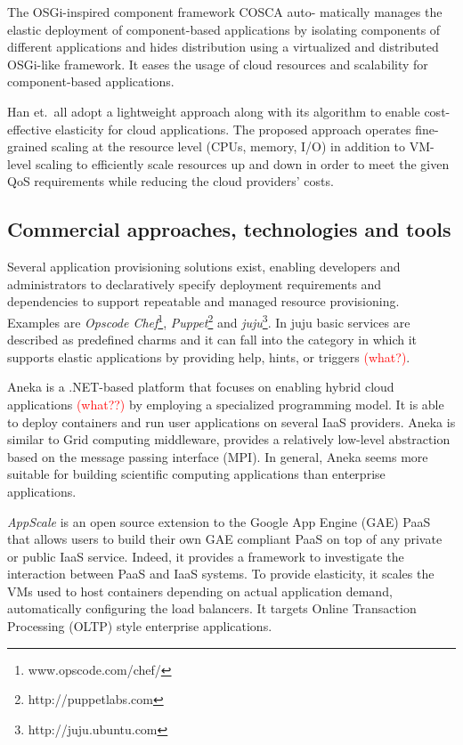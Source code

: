 \documentclass{sig-alternate}
\newcommand\todo[1]{\textcolor{red}{(#1)}}
\begin{document}
The OSGi-inspired component framework COSCA \cite {kachele2013component} auto- matically manages the elastic deployment of component-based applications by isolating components of different applications and hides distribution using a virtualized and distributed OSGi-like framework. It eases the usage of cloud resources and scalability for component-based applications. 

Han et.~all \cite{han2012lightweight} adopt a lightweight approach along with its algorithm to enable cost-effective elasticity for cloud applications. The proposed approach operates fine-grained scaling at the resource level (CPUs, memory, I/O) in addition to VM-level scaling to efficiently scale resources up and down in order to meet the given QoS requirements while reducing the cloud providers’ costs.

\subsection{Commercial approaches, technologies and tools}
\label{sec:tools}
Several application provisioning solutions exist, enabling developers and administrators to declaratively specify deployment requirements and dependencies to support repeatable and managed resource provisioning. Examples are \emph{Opscode Chef}\footnote{www.opscode.com/chef/}, \emph{Puppet}\footnote{http://puppetlabs.com} and \emph{juju}\footnote{http://juju.ubuntu.com}. In juju basic services are described as predefined charms and it can fall into the category in which it supports elastic applications by providing help, hints, or triggers \todo{what?}.
 
Aneka \cite{vecchiola2009aneka} is a .NET-based platform that focuses on enabling hybrid cloud applications \todo{what??} by employing a specialized programming model. It is able to deploy containers and run user applications on several IaaS providers. Aneka is similar to Grid computing middleware, provides a relatively low-level abstraction based on the message passing interface (MPI). In general, Aneka seems more suitable for building scientific computing applications than enterprise applications. 

\emph{AppScale} \cite{chohan2009appscale} is an open source extension to the Google App Engine (GAE) PaaS that allows users to build their own GAE compliant PaaS on top of any private or public IaaS service. Indeed, it provides a framework to investigate the interaction between PaaS and IaaS systems. To provide elasticity, it scales the VMs used to host containers depending on actual application demand, automatically configuring the load balancers. It targets Online Transaction Processing (OLTP) style enterprise applications.
\end{document}
